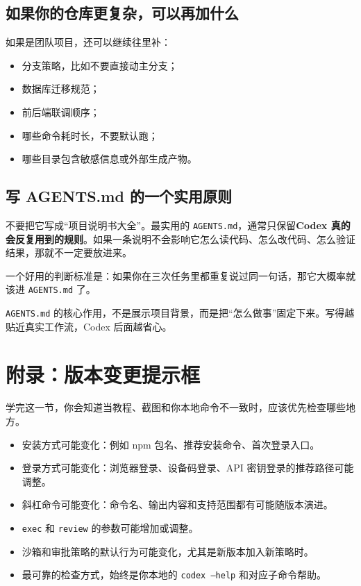 \documentclass[UTF8,a4paper,12pt]{ctexart}
\begin{document}
\subsection{如果你的仓库更复杂，可以再加什么}

如果是团队项目，还可以继续往里补：
\begin{itemize}
  \item 分支策略，比如不要直接动主分支；
  \item 数据库迁移规范；
  \item 前后端联调顺序；
  \item 哪些命令耗时长，不要默认跑；
  \item 哪些目录包含敏感信息或外部生成产物。
\end{itemize}

\subsection{写 AGENTS.md 的一个实用原则}

不要把它写成“项目说明书大全”。最实用的 \texttt{AGENTS.md}，通常只保留\textbf{Codex 真的会反复用到的规则}。如果一条说明不会影响它怎么读代码、怎么改代码、怎么验证结果，那就不一定要放进来。

\begin{tipbox}
一个好用的判断标准是：如果你在三次任务里都重复说过同一句话，那它大概率就该进 \texttt{AGENTS.md} 了。
\end{tipbox}

\begin{sumbox}
\texttt{AGENTS.md} 的核心作用，不是展示项目背景，而是把“怎么做事”固定下来。写得越贴近真实工作流，Codex 后面越省心。
\end{sumbox}

\section{附录：版本变更提示框}

\begin{learnbox}
学完这一节，你会知道当教程、截图和你本地命令不一致时，应该优先检查哪些地方。
\end{learnbox}

\begin{versionbox}
\begin{itemize}
  \item 安装方式可能变化：例如 npm 包名、推荐安装命令、首次登录入口。
  \item 登录方式可能变化：浏览器登录、设备码登录、API 密钥登录的推荐路径可能调整。
  \item 斜杠命令可能变化：命令名、输出内容和支持范围都有可能随版本演进。
  \item \texttt{exec} 和 \texttt{review} 的参数可能增加或调整。
  \item 沙箱和审批策略的默认行为可能变化，尤其是新版本加入新策略时。
  \item 最可靠的检查方式，始终是你本地的 \texttt{codex --help} 和对应子命令帮助。
\end{itemize}
\end{versionbox}
\end{document}
